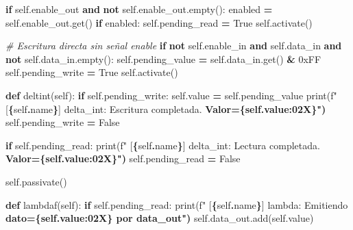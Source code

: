 \documentclass[12pt,oneside]{templates/unerthesis}
\newenvironment{Shaded}{\begin{snugshade}}{\end{snugshade}}
\newcommand{\BaseNTok}[1]{\textcolor[rgb]{0.00,0.00,0.81}{#1}}
\newcommand{\BuiltInTok}[1]{#1}
\newcommand{\CommentTok}[1]{\textcolor[rgb]{0.56,0.35,0.01}{\textit{#1}}}
\newcommand{\ControlFlowTok}[1]{\textcolor[rgb]{0.13,0.29,0.53}{\textbf{#1}}}
\newcommand{\ErrorTok}[1]{\textcolor[rgb]{0.64,0.00,0.00}{\textbf{#1}}}
\newcommand{\KeywordTok}[1]{\textcolor[rgb]{0.13,0.29,0.53}{\textbf{#1}}}
\newcommand{\NormalTok}[1]{#1}
\newcommand{\OperatorTok}[1]{\textcolor[rgb]{0.81,0.36,0.00}{\textbf{#1}}}
\newcommand{\SpecialCharTok}[1]{\textcolor[rgb]{0.81,0.36,0.00}{\textbf{#1}}}
\newcommand{\SpecialStringTok}[1]{\textcolor[rgb]{0.31,0.60,0.02}{#1}}
\newcommand{\VariableTok}[1]{\textcolor[rgb]{0.00,0.00,0.00}{#1}}
\begin{document}
\begin{Shaded}
\begin{Highlighting}[]
        \ControlFlowTok{if} \VariableTok{self}\NormalTok{.enable\_out }\KeywordTok{and} \KeywordTok{not} \VariableTok{self}\NormalTok{.enable\_out.empty():}
\NormalTok{            enabled }\OperatorTok{=} \VariableTok{self}\NormalTok{.enable\_out.get()}
            \ControlFlowTok{if}\NormalTok{ enabled:}
                \VariableTok{self}\NormalTok{.pending\_read }\OperatorTok{=} \VariableTok{True}
                \VariableTok{self}\NormalTok{.activate()}
        
        \CommentTok{\# Escritura directa sin señal enable}
        \ControlFlowTok{if} \KeywordTok{not} \VariableTok{self}\NormalTok{.enable\_in }\KeywordTok{and} \VariableTok{self}\NormalTok{.data\_in }\KeywordTok{and} 
        \KeywordTok{not} \VariableTok{self}\NormalTok{.data\_in.empty():}
            \VariableTok{self}\NormalTok{.pending\_value }\OperatorTok{=} \VariableTok{self}\NormalTok{.data\_in.get() }\OperatorTok{\&} \BaseNTok{0xFF}
            \VariableTok{self}\NormalTok{.pending\_write }\OperatorTok{=} \VariableTok{True}
            \VariableTok{self}\NormalTok{.activate()}
    
    \KeywordTok{def}\NormalTok{ deltint(}\VariableTok{self}\NormalTok{):}
        \ControlFlowTok{if} \VariableTok{self}\NormalTok{.pending\_write:}
            \VariableTok{self}\NormalTok{.value }\OperatorTok{=} \VariableTok{self}\NormalTok{.pending\_value}
            \BuiltInTok{print}\NormalTok{(}\SpecialStringTok{f"  [}\SpecialCharTok{\{}\VariableTok{self}\SpecialCharTok{.}\NormalTok{name}\SpecialCharTok{\}}\SpecialStringTok{] delta\_int: Escritura completada.}
\ErrorTok{            Valor=\{self.value:02X\}")}
            \VariableTok{self}\NormalTok{.pending\_write }\OperatorTok{=} \VariableTok{False}
        
        \ControlFlowTok{if} \VariableTok{self}\NormalTok{.pending\_read:}
            \BuiltInTok{print}\NormalTok{(}\SpecialStringTok{f"  [}\SpecialCharTok{\{}\VariableTok{self}\SpecialCharTok{.}\NormalTok{name}\SpecialCharTok{\}}\SpecialStringTok{] delta\_int: Lectura completada.}
\ErrorTok{            Valor=\{self.value:02X\}")}
            \VariableTok{self}\NormalTok{.pending\_read }\OperatorTok{=} \VariableTok{False}
        
        \VariableTok{self}\NormalTok{.passivate()}
    
    \KeywordTok{def}\NormalTok{ lambdaf(}\VariableTok{self}\NormalTok{):}
        \ControlFlowTok{if} \VariableTok{self}\NormalTok{.pending\_read:}
            \BuiltInTok{print}\NormalTok{(}\SpecialStringTok{f"  [}\SpecialCharTok{\{}\VariableTok{self}\SpecialCharTok{.}\NormalTok{name}\SpecialCharTok{\}}\SpecialStringTok{] lambda: Emitiendo }
\ErrorTok{            dato=\{self.value:02X\} por data\_out")}
            \VariableTok{self}\NormalTok{.data\_out.add(}\VariableTok{self}\NormalTok{.value)}
    

\end{Highlighting}
\end{Shaded}
\end{document}
